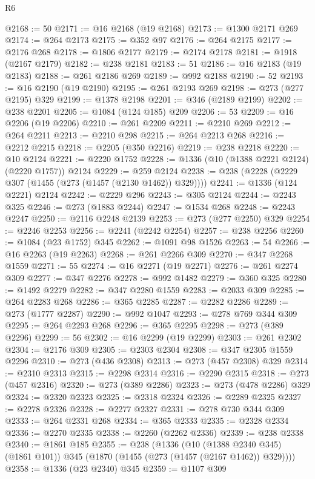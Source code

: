 \begin{lexlean}{R6}
\begin{coremodule}
{{{{{{{{{{{{{{{{{{{@2168 := 50
@2171 := @16 @2168 (@19 @2168)
@2173 := @1300 @2171 @269
@2174 := @264 @2173
@2175 := @352 @97
@2176 := @264 @2175
@2177 := @2176 @268
@2178 := @1806 @2177
@2179 := @2174 @2178
@2181 := @1918 (@2167 @2179)
@2182 := @238 @2181
@2183 := 51
@2186 := @16 @2183 (@19 @2183)
@2188 := @261 @2186 @269
@2189 := @992 @2188
@2190 := 52
@2193 := @16 @2190 (@19 @2190)
@2195 := @261 @2193 @269
@2198 := @273 (@277 @2195) @329
@2199 := @1378 @2198
@2201 := @346 (@2189 @2199)
@2202 := @238 @2201
@2205 := @1084 (@124 @185) @209
@2206 := 53
@2209 := @16 @2206 (@19 @2206)
@2210 := @261 @2209
@2211 := @2210 @269
@2212 := @264 @2211
@2213 := @2210 @298
@2215 := @264 @2213 @268
@2216 := @2212 @2215
@2218 := @2205 (@350 @2216)
@2219 := @238 @2218
@2220 := @10 @2124
@2221 := @2220 @1752
@2228 := @1336 (@10 (@1388 @2221 @2124) (@2220 @1757)) @2124
@2229 := @259 @2124
@2238 := @238 (@2228 (@2229 @307 (@1455 (@273 (@1457 (@2130 @1462)) @329))))
@2241 := @1336 (@124 @2221) @2124
@2242 := @2229 @296
@2243 := @305 @2124
@2244 := @2243 @325
@2246 := @273 (@1883 @2244)
@2247 := @1534 @268
@2248 := @2243 @2247
@2250 := @2116 @2248 @2139
@2253 := @273 (@277 @2250) @329
@2254 := @2246 @2253
@2256 := @2241 (@2242 @2254)
@2257 := @238 @2256
@2260 := @1084 (@23 @1752) @345
@2262 := @1091 @98 @1526
@2263 := 54
@2266 := @16 @2263 (@19 @2263)
@2268 := @261 @2266 @309
@2270 := @347 @2268 @1559
@2271 := 55
@2274 := @16 @2271 (@19 @2271)
@2276 := @261 @2274 @309
@2277 := @347 @2276
@2278 := @992 @1482
@2279 := @360 @325
@2280 := @1492 @2279
@2282 := @347 @2280 @1559
@2283 := @2033 @309
@2285 := @264 @2283 @268
@2286 := @365 @2285
@2287 := @2282 @2286
@2289 := @273 (@1777 @2287)
@2290 := @992 @1047
@2293 := @278 @769 @344 @309
@2295 := @264 @2293 @268
@2296 := @365 @2295
@2298 := @273 (@389 @2296)
@2299 := 56
@2302 := @16 @2299 (@19 @2299)
@2303 := @261 @2302
@2304 := @2176 @309
@2305 := @2303 @2304
@2308 := @347 @2305 @1559 @2296
@2310 := @273 (@436 @2308)
@2313 := @273 (@457 @2308) @329
@2314 := @2310 @2313
@2315 := @2298 @2314
@2316 := @2290 @2315
@2318 := @273 (@457 @2316)
@2320 := @273 (@389 @2286)
@2323 := @273 (@478 @2286) @329
@2324 := @2320 @2323
@2325 := @2318 @2324
@2326 := @2289 @2325
@2327 := @2278 @2326
@2328 := @2277 @2327
@2331 := @278 @730 @344 @309
@2333 := @264 @2331 @268
@2334 := @365 @2333
@2335 := @2328 @2334
@2336 := @2270 @2335
@2338 := @2260 (@2262 @2336)
@2339 := @238 @2338
@2340 := @1861 @185
@2355 := @238
    (@1336
      (@10 (@1388 @2340 @345) (@1861 @101))
      @345
      (@1870 (@1455 (@273 (@1457 (@2167 @1462)) @329))))
@2358 := @1336 (@23 @2340) @345
@2359 := @1107 @309
}}}}}}}}}}}}}}}}}}}
\end{coremodule}
\end{lexlean}
